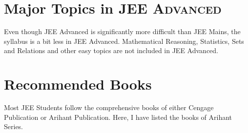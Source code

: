 \documentclass{article}
\begin{document}
	\section{Major Topics in JEE \textsc{Advanced}}
	
	Even though JEE Advanced is significantly more difficult than JEE Mains, the syllabus is a bit less in JEE Advanced. Mathematical Reasoning, Statistics, Sets and Relations and other easy topics are not included in JEE Advanced.
	
	\section{Recommended Books}
	
	Most JEE Students follow the comprehensive books of either Cengage Publication or Arihant Publication. Here, I have listed the books of Arihant Series.
	
\end{document}
